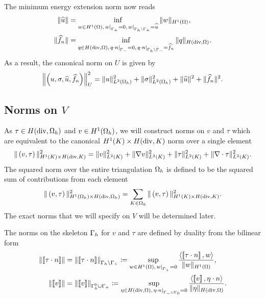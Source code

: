 The minimum energy extension norm  now reads
\begin{align*}
\|\widehat{u}\| &= \inf_{w\in H^1(\Omega),
  \left.w\right|_{\Gamma_+}=0, \left.w\right |_{\Gh\setminus
    \Gamma_+ } = \widehat{u}} \|w\|_{H^1(\Omega)}, \\ \|\widehat{f}_n\|
&= \inf_{q\in H({\rm div},\Omega), \left.q\cdot n\right|_{\Gamma_-}=
  0, \left. q\cdot n \right |_{\Gh\setminus
    \Gamma_-} = \widehat{f}_n}
\|q\|_{H({\rm div},\Omega)}.
\end{align*}
As a result, the canonical norm on $U$ is given by
\[
\left\|\left(u,\sigma,\widehat{u},\widehat{f}_n\right)\right\|_U^2 = 
\|u\|_{L^2(\Oh)}^2 + \|\sigma\|_{L^2(\Oh)}^2 +
\|\widehat{u}\|^2 + \|\widehat{f}_n\|^2.
\]

\subsection{Norms on $V$}

As $\tau \in H({\rm div},\Oh)$ and $v \in H^1(\Oh)$, we will construct norms on $v$ and $\tau$ which are equivalent to the canonical $H^1(K) \times H({\rm div},K)$ norm over a single element
\[
\|\left(v,\tau\right)\|_{H^1(K) \times H({\rm div},K)}^2 =
\|v\|_{L^2(K)}^2 + \|\grad v\|_{L^2(K)}^2 + \|\tau\|_{L^2(K)}^2 +
\|\div \tau\|_{L^2(K)}^2.
\]
The squared norm over the entire triangulation $\Oh$ is defined to be the squared sum of contributions from each element
\[
\|\left(v,\tau\right)\|_{H^1(\Oh) \times H({\rm div},\Oh)}^2
= \sum_{K\in \Oh} \|\left(v,\tau\right)\|_{H^1(K) \times H({\rm
    div},K)}^2.
\]
The exact norms that we will specify on $V$ will be determined later. 

The norms on the skeleton $\Gh$ for $v$ and $\tau$ are defined by duality from the bilinear form
\begin{align*}
\left\|\jump{\tau\cdot n}\right\| &= \left\|\jump{\tau\cdot n}\right\|_{\Gh \setminus \Gamma_+} \coloneqq \sup_{w\in H^1(\Omega), \left.w\right|_{\Gamma_+} = 0} \frac{\langle \jump{\tau \cdot n}, w\rangle}{\|w\|_{H^1(\Omega)}},\\
\left\|\jump{v}\right\|&=\left\|\jump{v}\right\|_{\Gh^0 \cup \Gamma_+} \coloneqq \sup_{\eta\in H({\rm div},\Omega), \left.\eta\cdot n\right|_{\Gamma_- \cup \Gamma_0} = 0} \frac{\langle \jump{v}, \eta\cdot n\rangle}{\|\eta\|_{H({\rm div},\Omega)}}.
\end{align*}

